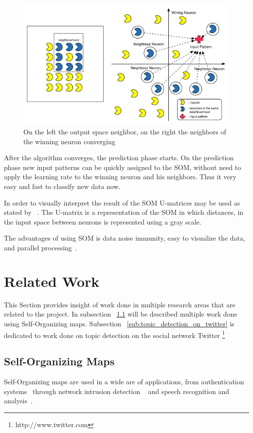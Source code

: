 \begin{figure}
  \begin{center}
    \includegraphics[width=12cm]{images/5_neighbours_converge.jpg}
  \end{center}
  \caption{ On the left the output space neighbor, on the right the neighbors of the winning neuron converging }
  \label{fig:5_neighbours_converge}
\end{figure}

After the algorithm converges, the prediction phase starts. On the prediction phase new input patterns can be quickly assigned to the SOM, without need to apply the learning rate to the winning neuron and his neighbors. Thus it very easy and fast to classify new data now.

In order to visually interpret the result of the SOM U-matrices may be used as stated by ~\citep{Bacao2005}. The U-matrix is a representation of the SOM in which distances, in the input space between neurons is represented using a gray scale.

The advantages of using SOM is data noise immunity, easy to visualize the data, and parallel processing~\cite{Liu2012b}.

\section{Related Work}
\label{sec:related_work}

This Section provides insight of work done in multiple research areas that are related to the project. In subsection ~\ref{sub:self_organizing_maps} will be described multiple work done using Self-Organizing maps. Subsection ~\ref{sub:topic_detection_on_twitter} is dedicated to work done on topic detection on the social network Twitter \footnote{http://www.twitter.com}

\subsection{Self-Organizing Maps} 
\label{sub:self_organizing_maps}
Self-Organizing maps are used in a wide are of applications, from authentication systems~\cite{Dozono2012} through network intrusion detection ~\cite{intrusion_som} and speech recognition and analysis~\cite{phonetic_typewiter}.

